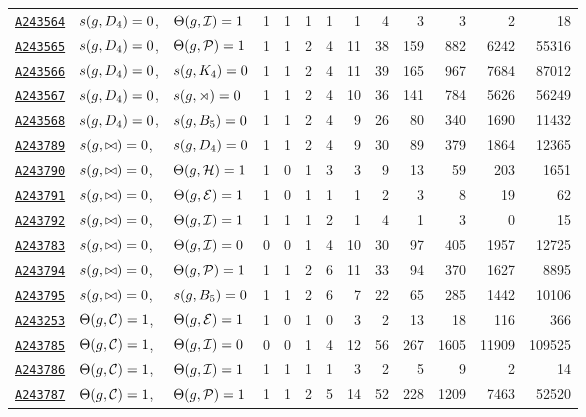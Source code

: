 \documentclass[12pt]{article}
\newcommand{\OEIS}[1]
{\href{https://oeis.org/#1}{\texttt{#1}}}
\begin{document}
\begin{appendices}
\begin{longtable}{ l l l r r r r r r r r r r}
\OEIS{A243564} & $s{}(g,D_4) =0$, & $\Theta(g,\mathcal{I}) =1$ & 1 & 1 & 1 & 1 & 1 & 4 & 3 & 3 & 2 & 18 \\
\OEIS{A243565} & $s{}(g,D_4) =0$, & $\Theta(g,\mathcal{P}) =1$ & 1 & 1 & 2 & 4 & 11 & 38 & 159 & 882 & 6242 & 55316 \\
\OEIS{A243566} & $s{}(g,D_4) =0$, & $s{}(g,K_4) =0$ & 1 & 1 & 2 & 4 & 11 & 39 & 165 & 967 & 7684 & 87012 \\
\OEIS{A243567} & $s{}(g,D_4) =0$, & $s{}(g,\rtimes) =0$ & 1 & 1 & 2 & 4 & 10 & 36 & 141 & 784 & 5626 & 56249 \\
\OEIS{A243568} & $s{}(g,D_4) =0$, & $s{}(g,B_5) =0$ & 1 & 1 & 2 & 4 & 9 & 26 & 80 & 340 & 1690 & 11432 \\
\OEIS{A243789} & $s{}(g,\bowtie) =0$, & $s{}(g,D_4) =0$ & 1 & 1 & 2 & 4 & 9 & 30 & 89 & 379 & 1864 & 12365 \\
\OEIS{A243790} & $s{}(g,\bowtie) =0$, & $\Theta(g,\mathcal{H}) =1$ & 1 & 0 & 1 & 3 & 3 & 9 & 13 & 59 & 203 & 1651 \\
\OEIS{A243791} & $s{}(g,\bowtie) =0$, & $\Theta(g,\mathcal{E}) =1$ & 1 & 0 & 1 & 1 & 1 & 2 & 3 & 8 & 19 & 62 \\
\OEIS{A243792} & $s{}(g,\bowtie) =0$, & $\Theta(g,\mathcal{I}) =1$ & 1 & 1 & 1 & 2 & 1 & 4 & 1 & 3 & 0 & 15 \\
\OEIS{A243783} & $s{}(g,\bowtie) =0$, & $\Theta(g,\mathcal{I}) =0$ & 0 & 0 & 1 & 4 & 10 & 30 & 97 & 405 & 1957 & 12725 \\
\OEIS{A243794} & $s{}(g,\bowtie) =0$, & $\Theta(g,\mathcal{P}) =1$ & 1 & 1 & 2 & 6 & 11 & 33 & 94 & 370 & 1627 & 8895 \\
\OEIS{A243795} & $s{}(g,\bowtie) =0$, & $s{}(g,B_5) =0$ & 1 & 1 & 2 & 6 & 7 & 22 & 65 & 285 & 1442 & 10106 \\
\OEIS{A243253} & $\Theta(g,\mathcal{C}) =1$, & $\Theta(g,\mathcal{E}) =1$ & 1 & 0 & 1 & 0 & 3 & 2 & 13 & 18 & 116 & 366 \\
\OEIS{A243785} & $\Theta(g,\mathcal{C}) =1$, & $\Theta(g,\mathcal{I}) =0$ & 0 & 0 & 1 & 4 & 12 & 56 & 267 & 1605 & 11909 & 109525 \\
\OEIS{A243786} & $\Theta(g,\mathcal{C}) =1$, & $\Theta(g,\mathcal{I}) =1$ & 1 & 1 & 1 & 1 & 3 & 2 & 5 & 9 & 2 & 14 \\
\OEIS{A243787} & $\Theta(g,\mathcal{C}) =1$, & $\Theta(g,\mathcal{P}) =1$ & 1 & 1 & 2 & 5 & 14 & 52 & 228 & 1209 & 7463 & 52520 \\

\end{longtable}
\end{appendices}
\end{document}
